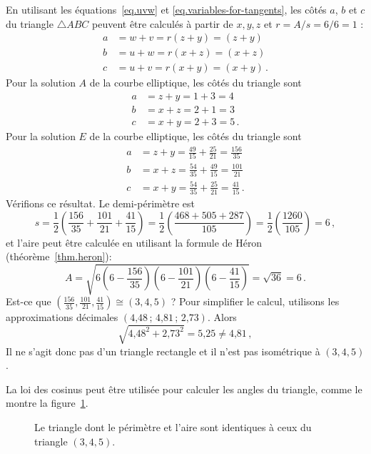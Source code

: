 En utilisant les équations~\ref{eq.uvw} et  \ref{eq.variables-for-tangents},  les côtés $a$, $b$ et $c$ du triangle $\triangle ABC$ peuvent être calculés à partir de $x,y,z$ et $r=A/s=6/6=1$ :
%
\begin{align*}
a&=w+v = r(z+y)=(z+y)\\
b&=u+w= r(x+z)=(x+z)\\
c&=u+v=r(x+y)=(x+y)\,.
\end{align*}
Pour la solution $A$ de la courbe elliptique, les côtés du triangle sont 
\begin{align*}
a &= z+y = 1+3 = 4\\
b &= x+z = 2+1=3\\
c &= x+y = 2+3=5\,.
\end{align*}
Pour la solution $E$ de la courbe elliptique, les côtés du triangle sont 
\begin{align*}
a &= z+y = \frac{49}{15} + \frac{25}{21} = \frac{156}{35}\\
b &= x+z = \frac{54}{35} + \frac{49}{15} = \frac{101}{21}\\
c &= x+y = \frac{54}{35} + \frac{25}{21} =\frac{41}{15}\,.
\end{align*}
Vérifions ce résultat. Le demi-périmètre est 
\[
s=\frac{1}{2}\left(\frac{156}{35} + \frac{101}{21}+\frac{41}{15}\right) = \frac{1}{2}\left(\frac{468+505+287}{105}\right) = \frac{1}{2}\left(\frac{1260}{105}\right)= 6\,,
\]
et l'aire peut être calculée en utilisant la formule de Héron (théorème~\ref{thm.heron}):
\[
A= \sqrt{6 \left(6-\frac{156}{35}\right) \left(6-\frac{101}{21}\right) \left(6-\frac{41}{15}\right)}=\sqrt{36} = 6\,.
\]
Est-ce que $\left(\frac{156}{35}, \frac{101}{21}, \frac{41}{15}\right)\cong(3,4,5)$ ? Pour simplifier le calcul, utilisons les approximations décimales $(\mbox{4,48}\,;\, \mbox{4,81}\,;\, \mbox{2,73})$. Alors 
\[
\sqrt{\mbox{4,48}^2+\mbox{2,73}^2}=\mbox{5,25}\neq \mbox{4,81}\,,
\]
Il ne s'agit donc pas d'un triangle rectangle et il n'est pas isométrique à $(3,4,5)$.

La loi des cosinus peut être utilisée pour calculer les angles du triangle, comme le montre la figure~\ref{f.not-a-right-triangle}.


\begin{figure}[htbp]
\centering

\caption{Le triangle dont le périmètre et l'aire sont identiques à ceux du triangle  $(3,4,5)$.}\label{f.not-a-right-triangle}
\end{figure}



